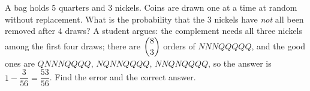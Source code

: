 A bag holds $5$ quarters and $3$ nickels. Coins are drawn one at a time at random without replacement. What is the probability that the $3$ nickels have \emph{not} all been removed after $4$ draws? A student argues: the complement needs all three nickels among the first four draws; there are $\dbinom83$ orders of $NNNQQQQQ$, and the good ones are $QNNNQQQQ$, $NQNNQQQQ$, $NNQNQQQQ$, so the answer is $1-\dfrac{3}{56}=\dfrac{53}{56}$. Find the error and the correct answer.
